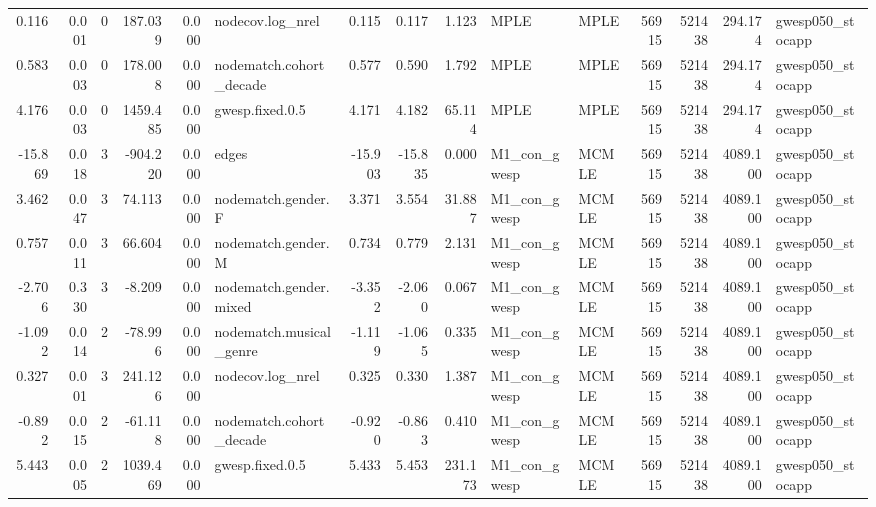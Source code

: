 \begin{table}
\begin{tabular}{rrrrrlrrrllrrrl}
    0.116 & 0.001 &        0 &   187.039 &     0.000 &        nodecov.log\_nrel &   0.115 &   0.117 &   1.123 &         MPLE &   MPLE &   56915 &   521438 &  294.174 & gwesp050\_stocapp \\
    0.583 & 0.003 &        0 &   178.008 &     0.000 & nodematch.cohort\_decade &   0.577 &   0.590 &   1.792 &         MPLE &   MPLE &   56915 &   521438 &  294.174 & gwesp050\_stocapp \\
    4.176 & 0.003 &        0 &  1459.485 &     0.000 &         gwesp.fixed.0.5 &   4.171 &   4.182 &  65.114 &         MPLE &   MPLE &   56915 &   521438 &  294.174 & gwesp050\_stocapp \\
  -15.869 & 0.018 &        3 &  -904.220 &     0.000 &                   edges & -15.903 & -15.835 &   0.000 & M1\_con\_gwesp &  MCMLE &   56915 &   521438 & 4089.100 & gwesp050\_stocapp \\
    3.462 & 0.047 &        3 &    74.113 &     0.000 &      nodematch.gender.F &   3.371 &   3.554 &  31.887 & M1\_con\_gwesp &  MCMLE &   56915 &   521438 & 4089.100 & gwesp050\_stocapp \\
    0.757 & 0.011 &        3 &    66.604 &     0.000 &      nodematch.gender.M &   0.734 &   0.779 &   2.131 & M1\_con\_gwesp &  MCMLE &   56915 &   521438 & 4089.100 & gwesp050\_stocapp \\
   -2.706 & 0.330 &        3 &    -8.209 &     0.000 &  nodematch.gender.mixed &  -3.352 &  -2.060 &   0.067 & M1\_con\_gwesp &  MCMLE &   56915 &   521438 & 4089.100 & gwesp050\_stocapp \\
   -1.092 & 0.014 &        2 &   -78.996 &     0.000 & nodematch.musical\_genre &  -1.119 &  -1.065 &   0.335 & M1\_con\_gwesp &  MCMLE &   56915 &   521438 & 4089.100 & gwesp050\_stocapp \\
    0.327 & 0.001 &        3 &   241.126 &     0.000 &        nodecov.log\_nrel &   0.325 &   0.330 &   1.387 & M1\_con\_gwesp &  MCMLE &   56915 &   521438 & 4089.100 & gwesp050\_stocapp \\
   -0.892 & 0.015 &        2 &   -61.118 &     0.000 & nodematch.cohort\_decade &  -0.920 &  -0.863 &   0.410 & M1\_con\_gwesp &  MCMLE &   56915 &   521438 & 4089.100 & gwesp050\_stocapp \\
    5.443 & 0.005 &        2 &  1039.469 &     0.000 &         gwesp.fixed.0.5 &   5.433 &   5.453 & 231.173 & M1\_con\_gwesp &  MCMLE &   56915 &   521438 & 4089.100 & gwesp050\_stocapp \\
\bottomrule
\end{tabular}
\end{table}
